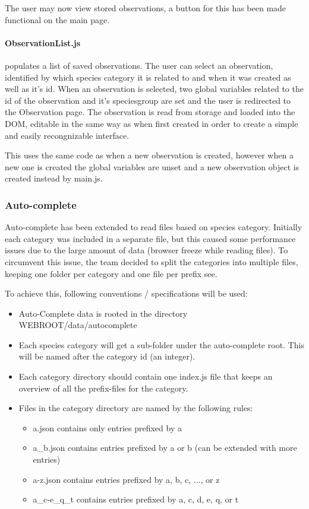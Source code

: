 The user may now view stored observations, a button for this has been made functional on the main page.
\paragraph{ObservationList.js} populates a list of saved observations.
The user can select an observation, identified by which species category it is related to and when it was created as well as it's id.
When an observation is selected, two global variables related to the id of the observation and it's speciesgroup are set and the user is redirected to the Observation page.
The observation is read from storage and loaded into the DOM, editable in the same way as when first created in order to create a simple and easily recongnizable interface.

This uses the same code as when a new observation is created, however when a new one is created the global variables are unset and a new observation object is created instead by main.js.

	\subsubsection{Auto-complete}

	Auto-complete has been extended to read files based on species category.
	Initially each category was included in a separate file, but this caused some
	performance issues due to the large amount of data (browser freeze while reading
	files). To circumvent this issue, the team decided to split the categories into
	multiple files, keeping one folder per category and one file per prefix see.

	To achieve this, following conventions / specifications will be used:

	\begin{itemize}
		\item Auto-Complete data is rooted in the directory WEBROOT/data/autocomplete
		\item Each species category will get a sub-folder under the auto-complete
		root. This will be named after the category id (an integer).
		\item Each category directory should contain one index.js file that
		keeps an overview of all the prefix-files for the category.
		\item Files in the category directory are named by the following rules:
			\begin{itemize}
				\item a.json contains only entries prefixed by a
				\item a\_b.json contains entries prefixed by a or b (can be
				extended with more entries)
				\item a-z.json contains entries prefixed by a, b, c, ..., or z
				\item a\_c-e\_q\_t contains entries prefixed by a, c, d, e, q, or t
			\end{itemize}
	\end{itemize}

